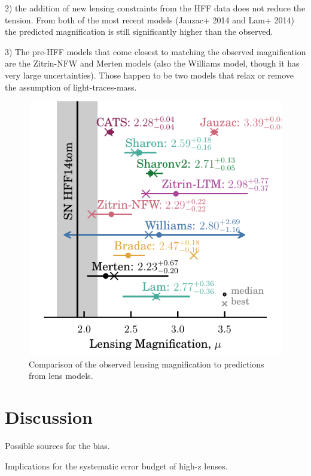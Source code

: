 2) the addition of new lensing constraints from the HFF data does not reduce the tension.  From both of the most recent models (Jauzac+ 2014 and Lam+ 2014) the predicted magnification is still significantly higher than the observed. 

3) The pre-HFF models that come closest to matching the observed magnification are the Zitrin-NFW and Merten models (also the Williams model, though it has very large uncertainties).  Those happen to be two models that relax or remove the assumption of light-traces-mass.  


\begin{figure}
\begin{center}
\includegraphics[width=\columnwidth]{FIG/lensing_test}
\caption{ 
Comparison of the observed lensing magnification to predictions from
lens models.
\label{fig:lensingtest} }
\end{center}
\end{figure}


\section{Discussion}

Possible sources for the bias. 

Implications for the systematic error budget of high-z lenses.

